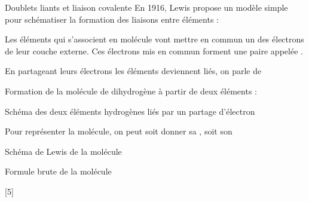 \begin{doc}{Doublets liants et liaison covalente}
  En 1916, Lewis propose un modèle simple pour schématiser la formation des liaisons entre éléments :
  \begin{importants}  
    Les éléments qui s'associent en molécule vont mettre en commun un des électrons de leur couche externe.
    Ces électrons mis en commun forment une paire appelée .
  \end{importants}
  \begin{importants}  
    En partageant leurs électrons les éléments deviennent liés, on parle de 
  \end{importants}
  
  \exemple Formation de la molécule de dihydrogène  à partir de deux éléments  :
  
  \begin{center}
    {\small Schéma des deux éléments hydrogènes liés par un partage d'électron}
    \vspace{8pt}
    
  \end{center}

  Pour représenter la molécule, on peut soit donner sa , soit son 
  \begin{multicols}{2}
    \begin{center}
      Schéma de Lewis de la molécule \\[4pt]

      {\Large {}}
    \end{center}

    \begin{center}
      Formule brute de la molécule \\[4pt]

      {\Large {}}
    \end{center}
  \end{multicols}
\end{doc}

\newpage
{}[5]

